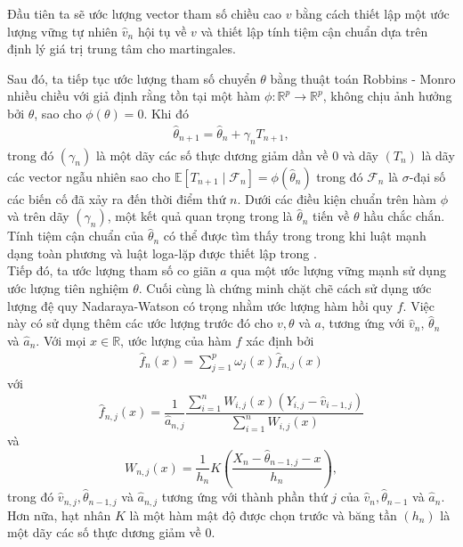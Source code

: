 Đầu tiên ta sẽ ước lượng vector tham số chiều cao $v$ bằng cách thiết lập một ước lượng vững tự nhiên $\widehat{v}_n$ hội tụ về $v$ và thiết lập tính tiệm cận chuẩn dựa trên định lý giá trị trung tâm cho martingales.

Sau đó, ta tiếp tục ước lượng tham số chuyển $\theta$ bằng thuật toán Robbins - Monro nhiều chiều với giả định rằng tồn tại một hàm $\phi: \mathbb{R}^{p} \rightarrow \mathbb{R}^{p}$, không chịu ảnh hưởng bởi $\theta$, sao cho $\phi(\theta)=0$. Khi đó 
\begin{align}
    \widehat{\theta}_{n+1}=\widehat{\theta}_{n}+\gamma_{n} T_{n+1},
    \label{1.3}
\end{align}
trong đó $\left(\gamma_{n}\right)$ là một dãy các số thực dương giảm dần về 0 và dãy $\left(T_{n}\right)$ là dãy các vector ngẫu nhiên sao cho $\mathbb{E}\left[T_{n+1} \mid \mathcal{F}_{n}\right]=\phi\left(\widehat{\theta}_{n}\right)$ trong đó $\mathcal{F}_{n}$ là $\sigma$-đại số các biến cố đã xảy ra đến thời điểm thứ $n$. Dưới các điều kiện chuẩn trên hàm $\phi$ và trên dãy $\left(\gamma_{n}\right)$, một kết quả quan trọng trong \cite{bercu} là $\widehat{\theta}_{n}$ tiến về $\theta$ hầu chắc chắn. Tính tiệm cận chuẩn của $\widehat{\theta}_{n}$ có thể được tìm thấy trong \cite{pelletier_weak_convergence} trong khi luật mạnh dạng toàn phương và luật loga-lặp được thiết lập trong \cite{pelletier_on_the_almost}.\\
Tiếp đó, ta ước lượng tham số co giãn $a$ qua một ước lượng vững mạnh sử dụng ước lượng tiên nghiệm $\theta$. Cuối cùng là chứng minh chặt chẽ cách sử dụng ước lượng đệ quy Nadaraya-Watson có trọng \cite{duflo} nhằm ước lượng hàm hồi quy $f$. Việc này có sử dụng thêm các ước lượng trước đó cho $v, \theta$ và $a$, tương ứng với $\widehat{v}_{n}$, $\widehat{\theta}_{n}$ và $\widehat{a}_{n}$. Với mọi $x \in \mathbb{R}$, ước lượng của hàm $f$ xác định bởi
\begin{align}
    \widehat{f}_{n}(x)=\sum_{j=1}^{p} \omega_{j}(x) \widehat{f}_{n, j}(x)
    \label{1.4}
\end{align}
với 
$$
\widehat{f}_{n, j}(x)=\frac{1}{\widehat{a}_{n, j}} \frac{\sum_{i=1}^{n} W_{i, j}(x)\left(Y_{i, j}-\widehat{v}_{i-1, j}\right)}{\sum_{i=1}^{n} W_{i, j}(x)}
$$
và
$$
W_{n, j}(x)=\frac{1}{h_{n}} K\left(\frac{X_{n}-\widehat{\theta}_{n-1, j}-x}{h_{n}}\right),
$$
trong đó $\widehat{v}_{n, j}, \widehat{\theta}_{n-1, j}$ và $\widehat{a}_{n, j}$ tương ứng với thành phần thứ $j$ của $\widehat{v}_{n}, \widehat{\theta}_{n-1}$ và $\widehat{a}_{n}$. Hơn nữa, hạt nhân $K$ là một hàm mật độ được chọn trước và băng tần $\left(h_{n}\right)$ là một dãy các số thực dương giảm về 0.

